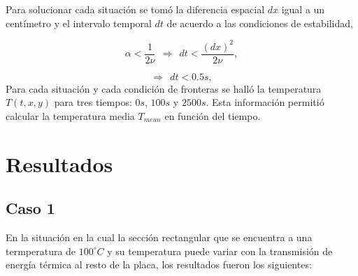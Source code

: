 \documentclass{article}
\begin{document}
Para solucionar cada situaci\'on se tom\'o la diferencia espacial $dx$ igual a un cent\'imetro y el intervalo temporal $dt$ de acuerdo a las condiciones de estabilidad,

\begin{equation}
\alpha < \frac{1}{2 \nu} \ \ \Rightarrow \ \ dt < \frac{(dx)^2}{2 \nu}, 
\end{equation}


\begin{equation}
\Rightarrow \ \ dt < 0.5 s,
\end{equation}
Para cada situaci\'on y cada condici\'on de fronteras se hall\'o la temperatura $T(t, x, y)$ para tres tiempos: $0s$, $100 s$ y $2500 s$. Esta informaci\'on permiti\'o calcular la temperatura media $T_{mean}$ en funci\'on del tiempo.

\section{Resultados}

\subsection{Caso 1} En la situaci\'on en la cual la secci\'on rectangular que se encuentra a una termperatura de $100^{\circ} C$ y su temperatura puede variar con la transmisi\'on de energ\'ia t\'ermica al resto de la placa, los resultados fueron los siguientes:
\end{document}
